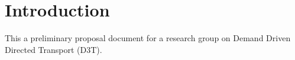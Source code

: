 \section{Introduction}
This a preliminary proposal document for a research group on Demand Driven Directed Transport (D3T). 